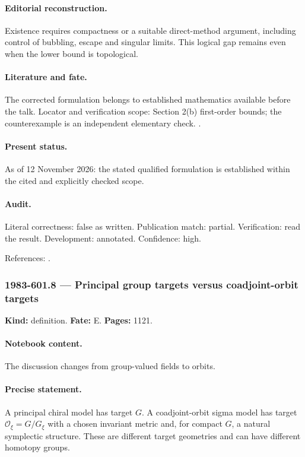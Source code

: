 \paragraph{Editorial reconstruction.} Existence requires compactness or a suitable direct-method argument, including control of bubbling, escape and singular limits. This logical gap remains even when the lower bound is topological.

\paragraph{Literature and fate.} The corrected formulation belongs to established mathematics available before the talk. Locator and verification scope: Section 2(b) first-order bounds; the counterexample is an independent elementary check. \cite{perelomov1981instantons}.

\paragraph{Present status.} As of 12 November 2026: the stated qualified formulation is established within the cited and explicitly checked scope.

\paragraph{Audit.} Literal correctness: false as written. Publication match: partial. Verification: read the result. Development: annotated. Confidence: high.

\noindent References: \citep{perelomov1981instantons}.\par

\subsubsection{1983-601.8 --- Principal group targets versus coadjoint-orbit targets}

\label{item:1983-601.8}

\noindent\textbf{Kind:} definition. \textbf{Fate:} E. \textbf{Pages:} 1121.\par

\paragraph{Notebook content.} The discussion changes from group-valued fields to orbits.

\paragraph{Precise statement.} A principal chiral model has target \(G\). A coadjoint-orbit sigma model has target \(\mathcal O_\xi=G/G_\xi\) with a chosen invariant metric and, for compact \(G\), a natural symplectic structure. These are different target geometries and can have different homotopy groups.

